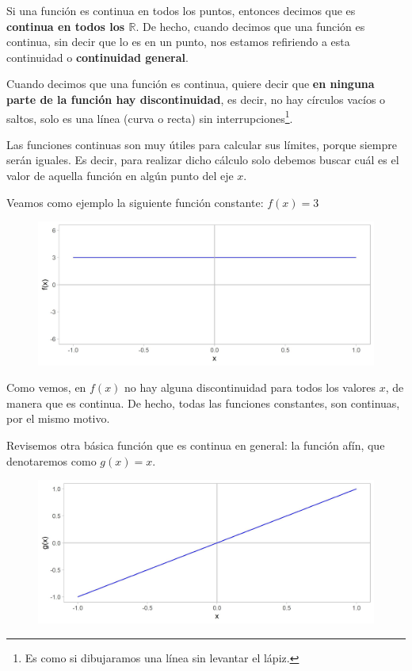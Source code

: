 \documentclass[12pt]{article}
\begin{document}
Si una función es continua en todos los puntos, entonces decimos que es \textbf{continua en todos los $\mathbb{R}$}. De hecho, cuando decimos que una función es continua, sin decir que lo es en un punto, nos estamos refiriendo a esta continuidad o \textbf{continuidad general}.

Cuando decimos que una función es continua, quiere decir que \textbf{en ninguna parte de la función hay discontinuidad}, es decir, no hay círculos vacíos o saltos, solo es una línea (curva o recta) sin interrupciones\footnote{Es como si dibujaramos una línea sin levantar el lápiz.}.

Las funciones continuas son muy útiles para calcular sus límites, porque siempre serán iguales. Es decir, para realizar dicho cálculo solo debemos buscar cuál es el valor de aquella función en algún punto del eje $x$.

Veamos como ejemplo la siguiente función constante: $f(x) = 3$

\begin{figure}[hbt!]
\centering
\includegraphics[scale=0.7]{img/continuity_f.jpg}
\end{figure}

Como vemos, en $f(x)$ no hay alguna discontinuidad para todos los valores $x$, de manera que es continua. De hecho, todas las funciones constantes, son continuas, por el mismo motivo.

Revisemos otra básica función que es continua en general: la función afín, que denotaremos como $g(x) = x$.

\begin{figure}[hbt!]
\centering
\includegraphics[scale=0.7]{img/continuity_g.jpg}
\end{figure}
\end{document}
